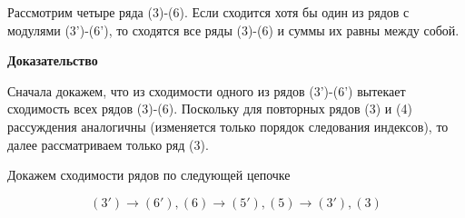  \begin{theorem}
 	Рассмотрим четыре ряда (3)-(6). Если сходится хотя бы один из рядов с модулями (3')-(6'), то сходятся все ряды (3)-(6) и суммы их равны между собой.
 \end{theorem}
 \textbf{Доказательство}
 
 Сначала докажем, что из сходимости одного из рядов (3')-(6') вытекает сходимость всех рядов (3)-(6). Поскольку для повторных рядов (3) и (4) рассуждения аналогичны (изменяется только порядок следования индексов), то далее рассматриваем только ряд (3).
 
 Докажем сходимости рядов по следующей цепочке
 
 \begin{equation*}
 	(3') \rightarrow (6'), (6) \rightarrow (5'), (5) \rightarrow (3'), (3)
 \end{equation*}
 

